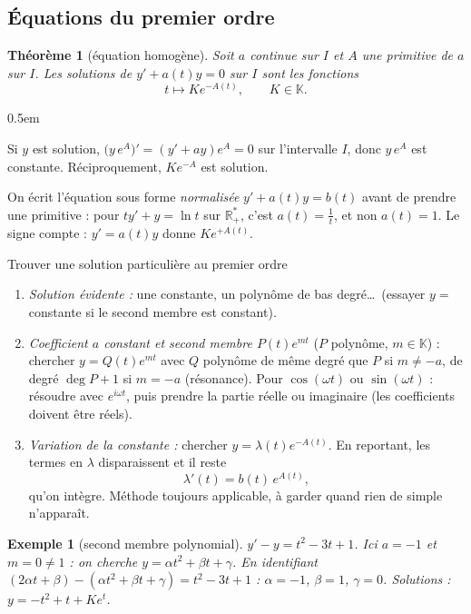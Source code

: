 \documentclass[a4paper,11pt]{article}
\makeatletter
\numberwithin{equation}{section}
\numberwithin{figure}{section}
\numberwithin{table}{section}
\theoremstyle{enonce}
\newtheorem{theoreme}[definition]{Théorème}
\theoremstyle{exemple}
\newtheorem{exemple}[definition]{Exemple}
\theoremstyle{remarque}
\renewcommand{\proofname}{Démonstration}
\renewenvironment{proof}[1][\proofname]{\par\pushQED{\qed}\normalfont
  \topsep0.5em\relax\trivlist\item[\hskip\labelsep\sffamily\itshape\color{Gris}#1.]\ignorespaces}
  {\popQED\endtrivlist\@endpefalse}
\newcommand{\K}{\mathbb{K}}
\newcommand{\R}{\mathbb{R}}
\makeatother
\begin{document}
\subsection{Équations du premier ordre}\label{ss:ordre1}

\begin{theoreme}[équation homogène]\label{t:ordre1}
Soit $a$ continue sur $I$ et $A$ une primitive de $a$ sur $I$. Les solutions de $y'+a(t)y=0$ sur $I$ sont les fonctions
\[t\mapsto Ke^{-A(t)},\qquad K\in\K.\]
\end{theoreme}

\begin{proof}
Si $y$ est solution, $\big(y\,e^{A}\big)'=(y'+ay)e^{A}=0$ sur l'intervalle $I$, donc $y\,e^{A}$ est constante. Réciproquement,
$Ke^{-A}$ est solution.
\end{proof}

\begin{attention}
On écrit l'équation sous forme \emph{normalisée} $y'+a(t)y=b(t)$ avant de prendre une primitive : pour $ty'+y=\ln t$ sur
$\R_+^*$, c'est $a(t)=\frac1t$, et non $a(t)=1$. Le signe compte : $y'=a(t)y$ donne $Ke^{+A(t)}$.
\end{attention}

\begin{methode}{Trouver une solution particulière au premier ordre}\label{m:part1}
\begin{enumerate}
\item \emph{Solution évidente :} une constante, un polynôme de bas degré\dots\ (essayer $y=$ constante si le second membre est constant).
\item \emph{Coefficient $a$ constant et second membre $P(t)e^{mt}$} ($P$ polynôme, $m\in\K$) : chercher $y=Q(t)e^{mt}$ avec $Q$
polynôme de même degré que $P$ si $m\neq-a$, de degré $\deg P+1$ si $m=-a$ (résonance).
Pour $\cos(\omega t)$ ou $\sin(\omega t)$ : résoudre avec $e^{i\omega t}$, puis prendre la partie réelle ou imaginaire
(les coefficients doivent être réels).
\item \emph{Variation de la constante :} chercher $y=\lambda(t)e^{-A(t)}$. En reportant, les termes en $\lambda$ disparaissent et il reste
\[\lambda'(t)=b(t)\,e^{A(t)},\]
qu'on intègre. Méthode toujours applicable, à garder quand rien de simple n'apparaît.
\end{enumerate}
\end{methode}

\begin{exemple}[second membre polynomial]
$y'-y=t^2-3t+1$. Ici $a=-1$ et $m=0\neq1$ : on cherche $y=\alpha t^2+\beta t+\gamma$. En identifiant
$(2\alpha t+\beta)-(\alpha t^2+\beta t+\gamma)=t^2-3t+1$ : $\alpha=-1$, $\beta=1$, $\gamma=0$. Solutions : $y=-t^2+t+Ke^t$.
\end{exemple}
\end{document}
